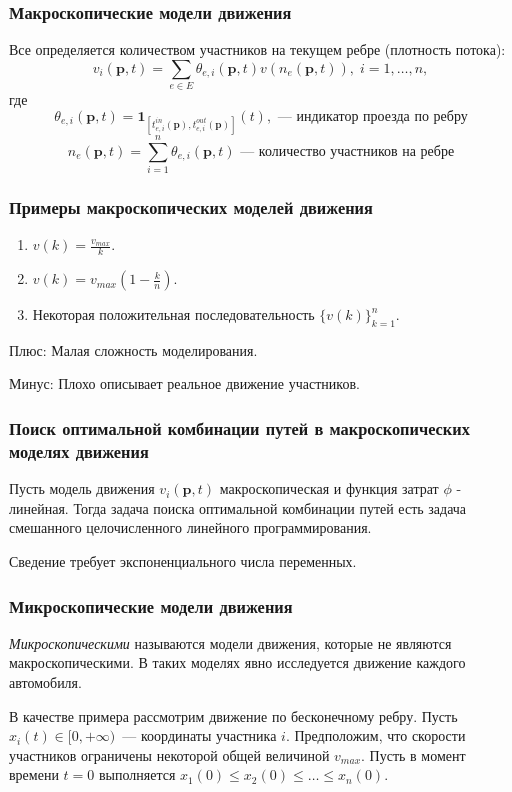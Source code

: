 \documentclass{beamer}
\begin{document}
\begin{frame}\frametitle{Макроскопические модели движения}
	Все определяется количеством участников на текущем ребре (плотность потока):
	$$v_i(\textbf{p}, t) = \sum \limits _{e \in E} \theta_{e, i} (\textbf{p}, t) v (n_e (\textbf{p}, t)), \; i = 1, \dots, n,$$
	где
	$$\theta_{e, i} (\textbf{p}, t) = \textbf{1}_{[t_{e, i}^{in} (\textbf{p}), t_{e, i}^{out} (\textbf{p})]} (t), \textit{ --- индикатор проезда по ребру}$$
	$$ n_{e}(\textbf{p}, t) = \sum\limits_{i = 1}^n\theta_{e, i}(\textbf{p}, t) \textit{ --- количество участников на ребре}$$
\end{frame}

\begin{frame}\frametitle{Примеры макроскопических моделей движения}
\begin{enumerate}
	\item $v (k) = \frac{v_{max}}{k}$.
	\item $v (k) = v_{max} (1 - \frac{k}{n})$.
	\item Некоторая положительная последовательность $\{v(k)\}_{k = 1}^n$.
\end{enumerate}
\vspace{10px}
	Плюс: Малая сложность моделирования.
	
	Минус: Плохо описывает реальное движение участников. 
	
\end{frame}

\begin{frame}\frametitle{Поиск оптимальной комбинации путей в макроскопических моделях движения}
	\begin{theorem}
		Пусть модель движения $ v_i(\textbf{p}, t)$ макроскопическая и функция затрат $\phi$ - линейная. Тогда задача поиска оптимальной комбинации путей есть задача смешанного целочисленного линейного программирования.
	\end{theorem}

  \bigskip
Сведение требует экспоненциального числа переменных.
\end{frame}

\begin{frame}\frametitle{Микроскопические модели движения}
\textit {Микроскопическими} называются модели движения, которые не являются макроскопическими. В таких моделях явно исследуется движение каждого автомобиля.
	
В качестве примера рассмотрим движение по бесконечному ребру. Пусть ${x_i(t) \in [0, +\infty)}$~--- координаты участника $i$. Предположим, что скорости участников ограничены некоторой общей величиной $v_{max}$. Пусть в момент времени ${t = 0}$ выполняется $x_1(0) \le x_2(0) \le \dots \le x_n(0)$.
\end{frame}
\end{document}
